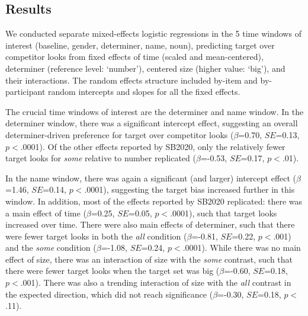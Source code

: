\documentclass[10pt,letterpaper]{article}
\begin{document}
\subsection{Results}

We conducted separate mixed-effects logistic regressions in the 5 time windows of interest (baseline, gender, determiner, name, noun), predicting target over competitor looks from fixed effects of time (scaled and mean-centered), determiner (reference level: `number'), centered size (higher value: `big'), and their interactions. The random effects structure included by-item and by-participant random intercepts and slopes for all the fixed effects.

The crucial time windows of interest are the determiner and name window. In the determiner window, there was a significant intercept effect, suggesting an overall determiner-driven preference for target over competitor looks ($\beta$=0.70, $SE$=0.13, $p<$.0001). Of the other effects reported by SB2020, only the relatively fewer target looks for \emph{some} relative to number replicated  ($\beta$=-0.53, $SE$=0.17, $p<$.01).

In the name window, there was again a significant (and larger) intercept effect ($\beta$=1.46, $SE$=0.14, $p<$.0001), suggesting the target bias increased further in this window. In addition, most of the effects reported by SB2020 replicated: there was a main effect of time  ($\beta$=0.25, $SE$=0.05, $p<$.0001), such that target looks increased over time. There were also main effects of determiner, such that there were fewer target looks in both the \emph{all} condition  ($\beta$=-0.81, $SE$=0.22, $p<$.001) and the \emph{some} condition   ($\beta$=-1.08, $SE$=0.24, $p<$.0001). While there was no main effect of size, there was an interaction of size with the \emph{some} contrast, such that there were fewer target looks when the target set was big   ($\beta$=-0.60, $SE$=0.18, $p<$.001). There was also a trending interaction of size with the \emph{all} contrast in the expected direction, which did not reach significance ($\beta$=-0.30, $SE$=0.18, $p<$.11).


\end{document}
